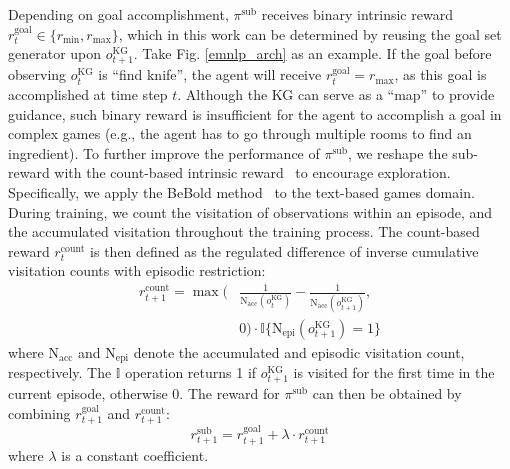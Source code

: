 \documentclass[11pt]{article}
\begin{document}
Depending on goal accomplishment, $\pi^{\text{sub}}$ receives binary intrinsic reward $r^{\text{goal}}_t \in \{ r_{\text{min}}, r_{\text{max}}\}$, which in this work can be determined by reusing the goal set generator upon $o_{t+1}^{\text{KG}}$.
Take Fig. \ref{emnlp_arch} as an example. If the goal before observing $o_t^{\text{KG}}$ is ``find knife'', the agent will receive $r^{\text{goal}}_t = r_{\text{max}}$, as this goal is accomplished at time step $t$.
Although the KG can serve as a ``map'' to provide guidance, such binary reward is insufficient for the agent to accomplish  a goal in complex games (e.g., the agent has to go through multiple rooms to find an ingredient).
To further improve the performance of $\pi^{\text{sub}}$, we reshape
the sub-reward with the count-based intrinsic reward~\cite{bellemare2016counting} to encourage exploration. 
Specifically, we apply the BeBold method~\cite{zhang2020counting} to the text-based games domain. 
During training, we count the visitation of observations within an episode, and the accumulated visitation throughout the training process.
The count-based reward $r^{\text{count}}_t$ is then defined as the regulated difference of inverse cumulative visitation counts with episodic restriction:
\begin{equation}
\begin{split}
     r^{\text{count}}_{t+1} = \max ( & 
     \frac{1}{\mathrm{N}_{\text{acc}}(o_{t}^{\text{KG}})} - \frac{1}{\mathrm{N}_{\text{acc}}(o_{t+1}^{\text{KG}})}, 
     \\ & 0) \cdot \mathbb{I}\{\mathrm{N}_{\text{epi}}(o_{t+1}^{\text{KG}}) = 1\}   
\end{split}
\label{eq_bebold}
\end{equation}
where $\mathrm{N}_{\text{acc}}$ and $\mathrm{N}_{\text{epi}}$ denote the accumulated and episodic visitation count, respectively.
The $\mathbb{I}$ operation returns 1 if $o_{t+1}^{\text{KG}}$ is visited for the first time in the current episode, otherwise 0. 
The reward for $\pi^{\text{sub}}$ can then be obtained by combining $r^{\text{goal}}_{t+1}$ and $r^{\text{count}}_{t+1}$: 
\begin{equation}
    r^{\text{sub}}_{t+1} = r^{\text{goal}}_{t+1} + \lambda \cdot r^{\text{count}}_{t+1}
\label{eq_sub}
\end{equation}
where $\lambda$ is a constant coefficient. 
\end{document}
